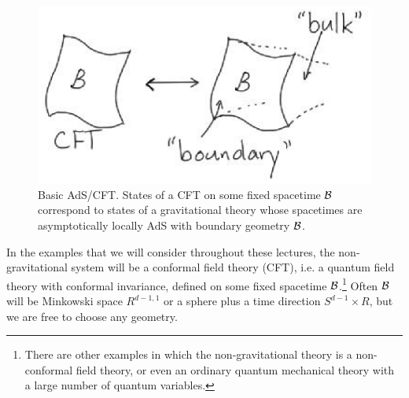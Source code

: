 \documentclass[12pt,epsf]{article}
\begin{document}
\begin{figure}
\centering
\includegraphics[width=0.5 \textwidth]{TASIadscft.eps}
\caption{Basic AdS/CFT. States of a CFT on some fixed spacetime ${\cal B}$ correspond to states of a gravitational theory whose spacetimes are asymptotically locally AdS with boundary geometry ${\cal B}$.}
\label{adscft}
\end{figure}

In the examples that we will consider throughout these lectures, the non-gravitational system will be a conformal field theory (CFT), i.e. a quantum field theory with conformal invariance, defined on some fixed spacetime ${\cal B}$.\footnote{There are other examples in which the non-gravitational theory is a non-conformal field theory, or even an ordinary quantum mechanical theory with a large number of quantum variables.} Often ${\cal B}$ will be Minkowski space $R^{d-1,1}$ or a sphere plus a time direction $S^{d-1} \times R$, but we are free to choose any geometry.
\end{document}
